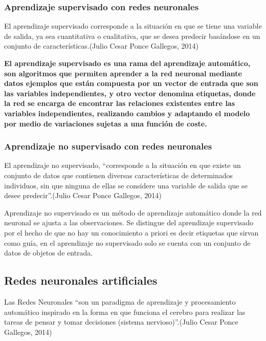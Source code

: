 \documentclass[
  12pt,
]{article}
\begin{document}
\hypertarget{aprendizaje-supervisado-con-redes-neuronales}{%
\subsubsection{Aprendizaje supervisado con redes
neuronales}\label{aprendizaje-supervisado-con-redes-neuronales}}

El aprendizaje supervisado corresponde a la situación en que se tiene
una variable de salida, ya sea cuantitativa o cualitativa, que se desea
predecir basándose en un conjunto de características.(Julio Cesar Ponce
Gallegos, 2014)

\textbf{El aprendizaje supervisado es una rama del aprendizaje
automático, son algoritmos que permiten aprender a la red neuronal
mediante datos ejemplos que están compuesta por un vector de entrada que
son las variables independientes, y otro vector denomina etiquetas,
donde la red se encarga de encontrar las relaciones existentes entre las
variables independientes, realizando cambios y adaptando el modelo por
medio de variaciones sujetas a una función de coste.}

\hypertarget{aprendizaje-no-supervisado-con-redes-neuronales}{%
\subsubsection{Aprendizaje no supervisado con redes
neuronales}\label{aprendizaje-no-supervisado-con-redes-neuronales}}

El aprendizaje no supervisado, ``corresponde a la situación en que
existe un conjunto de datos que contienen diversas características de
determinados individuos, sin que ninguna de ellas se considere una
variable de salida que se desee predecir''.(Julio Cesar Ponce Gallegos,
2014)

Aprendizaje no supervisado es un método de aprendizaje automático donde
la red neuronal se ajusta a las observaciones. Se distingue del
aprendizaje supervisado por el hecho de que no hay un conocimiento a
priori es decir etiquetas que sirvan como guía, en el aprendizaje no
supervisado solo se cuenta con un conjunto de datos de objetos de
entrada.

\hypertarget{redes-neuronales-artificiales}{%
\subsection{Redes neuronales
artificiales}\label{redes-neuronales-artificiales}}

Las Redes Neuronales ``son un paradigma de aprendizaje y procesamiento
automático inspirado en la forma en que funciona el cerebro para
realizar las tareas de pensar y tomar decisiones (sistema
nervioso)''.(Julio Cesar Ponce Gallegos, 2014)
\end{document}
